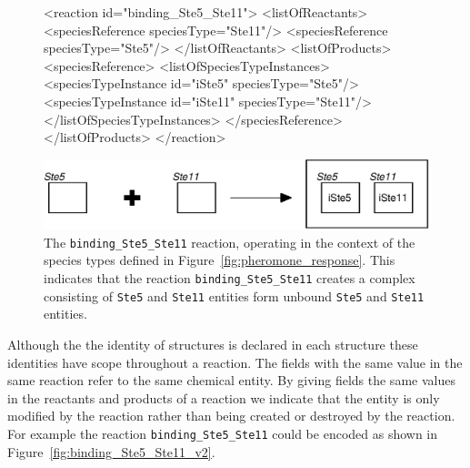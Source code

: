 \documentclass{cekarticle}
\begin{document}
\begin{figure}[h]
\begin{example}
<reaction id="binding_Ste5_Ste11">
    <listOfReactants>
        <speciesReference speciesType="Ste11"/>
        <speciesReference speciesType="Ste5"/>
    </listOfReactants>
    <listOfProducts>
        <speciesReference>
            <listOfSpeciesTypeInstances>
                <speciesTypeInstance id="iSte5" speciesType="Ste5"/>
                <speciesTypeInstance id="iSte11" speciesType="Ste11"/>
            </listOfSpeciesTypeInstances>
        </speciesReference>
    </listOfProducts>
</reaction>
\end{example}
  \vspace*{8pt}
  \centering
  \includegraphics[scale = 0.7]{binding_Ste5_Ste11.eps}
  \caption{The \texttt{binding\_Ste5\_Ste11} reaction, operating in the context of the species types
  defined in Figure~\ref{fig:pheromone_response}.  This indicates that the reaction
  \texttt{binding\_Ste5\_Ste11} creates a complex consisting of \texttt{Ste5} and \texttt{Ste11} entities
  form unbound \texttt{Ste5} and \texttt{Ste11} entities.}
  \label{fig:binding_Ste5_Ste11}
\end{figure}

Although the the identity of  structures is declared in each
 structure these identities have scope throughout a reaction.
The   fields with the same value in the same reaction refer
to the same chemical entity.  By giving   fields the same values
in the reactants and products of a reaction we indicate that the entity is only modified by the reaction
rather than being created or destroyed by the reaction.  For example the reaction
\texttt{binding\_Ste5\_Ste11} could be encoded as shown in Figure~\ref{fig:binding_Ste5_Ste11_v2}.
\end{document}
